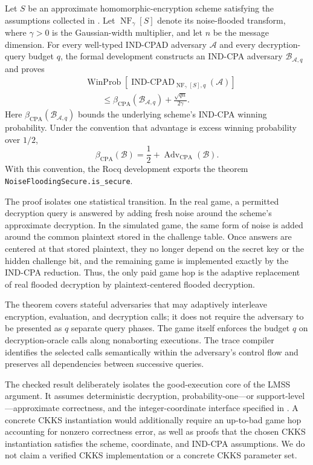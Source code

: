 Let $S$ be an approximate homomorphic-encryption scheme satisfying the assumptions collected in . Let $\operatorname{NF}_{\gamma}[S]$ denote its noise-flooded transform, where $\gamma>0$ is the Gaussian-width multiplier, and let $n$ be the message dimension. For every well-typed IND-CPAD adversary $\mathcal{A}$ and every decryption-query budget $q$, the formal development constructs an IND-CPA adversary $\mathcal{B}_{\mathcal{A},q}$ and proves
\begin{equation}
\begin{aligned}
&\operatorname{WinProb}\!\left[
\operatorname{IND\text{-}CPAD}_{
\operatorname{NF}_{\gamma}[S],q
}(\mathcal{A})
\right]
\\
&\qquad\leq
\beta_{\mathrm{CPA}}\!\left(
\mathcal{B}_{\mathcal{A},q}
\right)
+
\frac{\sqrt{qn}}{2\gamma}.
\end{aligned}
\label{eq:intro-main-bound}
\end{equation}
Here $\beta_{\mathrm{CPA}}(\mathcal{B}_{\mathcal{A},q})$ bounds the underlying scheme's IND-CPA winning probability. Under the convention that advantage is excess winning probability over $1/2$,
\[
\beta_{\mathrm{CPA}}(\mathcal{B})
=
\frac{1}{2}
+
\operatorname{Adv}_{\mathrm{CPA}}(\mathcal{B}).
\]
With this convention, the Rocq development exports the theorem
\mbox{\texttt{NoiseFloodingSecure.is\_secure}}.

The proof isolates one statistical transition. In the real game, a permitted decryption query is answered by adding fresh noise around the scheme's approximate decryption. In the simulated game, the same form of noise is added around the common plaintext stored in the challenge table. Once answers are centered at that stored plaintext, they no longer depend on the secret key or the hidden challenge bit, and the remaining game is implemented exactly by the IND-CPA reduction. Thus, the only paid game hop is the adaptive replacement of real flooded decryption by plaintext-centered flooded decryption.

The theorem covers stateful adversaries that may adaptively interleave encryption, evaluation, and decryption calls; it does not require the adversary to be presented as $q$ separate query phases. The game itself enforces the budget $q$ on decryption-oracle calls along nonaborting executions. The trace compiler identifies the selected calls semantically within the adversary's control flow and preserves all dependencies between successive queries.

The checked result deliberately isolates the good-execution core of the LMSS argument. It assumes deterministic decryption, probability-one---or support-level---approximate correctness, and the integer-coordinate interface specified in . A concrete CKKS instantiation would additionally require an up-to-bad game hop accounting for nonzero correctness error, as well as proofs that the chosen CKKS instantiation satisfies the scheme, coordinate, and IND-CPA assumptions. We do not claim a verified CKKS implementation or a concrete CKKS parameter set.

